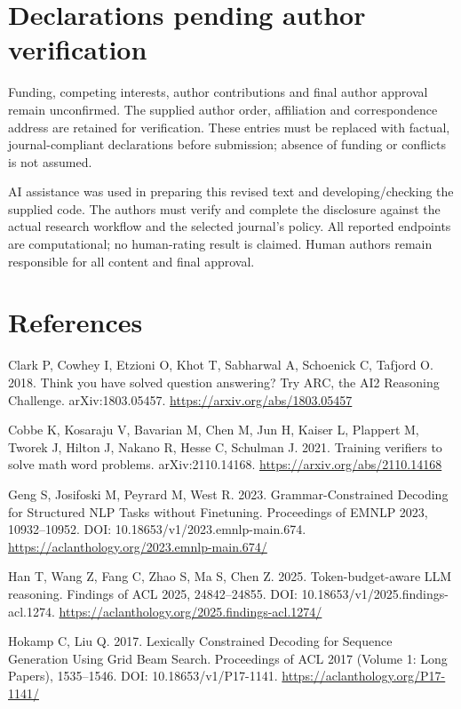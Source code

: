 \documentclass[
  12pt,
  a4paper,
]{article}
\begin{document}
\section{Declarations pending author
verification}\label{declarations-pending-author-verification}

Funding, competing interests, author contributions and final author
approval remain unconfirmed. The supplied author order, affiliation and
correspondence address are retained for verification. These entries must
be replaced with factual, journal-compliant declarations before
submission; absence of funding or conflicts is not assumed.

AI assistance was used in preparing this revised text and
developing/checking the supplied code. The authors must verify and
complete the disclosure against the actual research workflow and the
selected journal's policy. All reported endpoints are computational; no
human-rating result is claimed. Human authors remain responsible for all
content and final approval.

\section{References}\label{references}

Clark P, Cowhey I, Etzioni O, Khot T, Sabharwal A, Schoenick C, Tafjord
O. 2018. Think you have solved question answering? Try ARC, the AI2
Reasoning Challenge. arXiv:1803.05457.
\url{https://arxiv.org/abs/1803.05457}

Cobbe K, Kosaraju V, Bavarian M, Chen M, Jun H, Kaiser L, Plappert M,
Tworek J, Hilton J, Nakano R, Hesse C, Schulman J. 2021. Training
verifiers to solve math word problems. arXiv:2110.14168.
\url{https://arxiv.org/abs/2110.14168}

Geng S, Josifoski M, Peyrard M, West R. 2023. Grammar-Constrained
Decoding for Structured NLP Tasks without Finetuning. Proceedings of
EMNLP 2023, 10932--10952. DOI: 10.18653/v1/2023.emnlp-main.674.
\url{https://aclanthology.org/2023.emnlp-main.674/}

Han T, Wang Z, Fang C, Zhao S, Ma S, Chen Z. 2025. Token-budget-aware
LLM reasoning. Findings of ACL 2025, 24842--24855. DOI:
10.18653/v1/2025.findings-acl.1274.
\url{https://aclanthology.org/2025.findings-acl.1274/}

Hokamp C, Liu Q. 2017. Lexically Constrained Decoding for Sequence
Generation Using Grid Beam Search. Proceedings of ACL 2017 (Volume 1:
Long Papers), 1535--1546. DOI: 10.18653/v1/P17-1141.
\url{https://aclanthology.org/P17-1141/}
\end{document}
